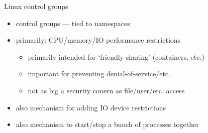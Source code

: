 \begin{frame}{Linux control groups}
    \begin{itemize}
    \item control groups --- tied to namespaces
    \item primarily: CPU/memory/IO performance restrictions
        \begin{itemize}
        \item primarily intended for `friendly sharing' (containers, etc.)
        \item important for preventing denial-of-service/etc.
        \item not as big a security conern as file/user/etc. access
        \end{itemize}
    \item also mechanism for adding IO device restrictions
    \item also mechanism to start/stop a bunch of processes together
    \end{itemize}
\end{frame}
